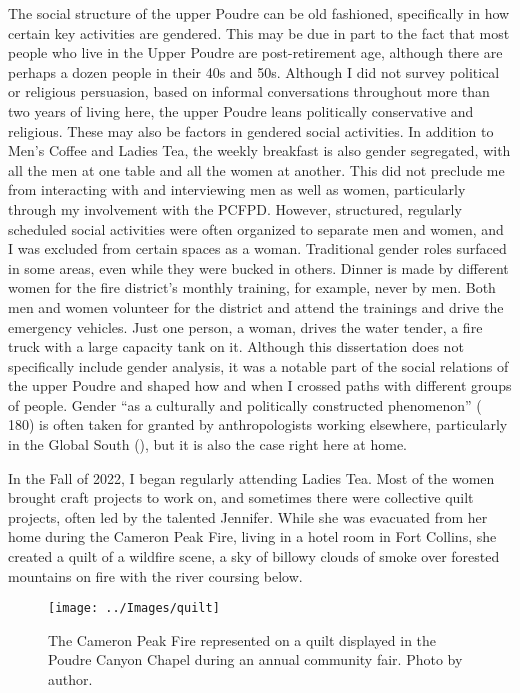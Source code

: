 \documentclass[
]{article}
\begin{document}
The social structure of the upper Poudre can be old fashioned, specifically in how certain key activities are gendered. This may be due in part to the fact that most people who live in the Upper Poudre are post-retirement age, although there are perhaps a dozen people in their 40s and 50s. Although I did not survey political or religious persuasion, based on informal conversations throughout more than two years of living here, the upper Poudre leans politically conservative and religious. These may also be factors in gendered social activities. In addition to Men's Coffee and Ladies Tea, the weekly breakfast is also gender segregated, with all the men at one table and all the women at another. This did not preclude me from interacting with and interviewing men as well as women, particularly through my involvement with the PCFPD. However, structured, regularly scheduled social activities were often organized to separate men and women, and I was excluded from certain spaces as a woman. Traditional gender roles surfaced in some areas, even while they were bucked in others. Dinner is made by different women for the fire district's monthly training, for example, never by men. Both men and women volunteer for the district and attend the trainings and drive the emergency vehicles. Just one person, a woman, drives the water tender, a fire truck with a large capacity tank on it. Although this dissertation does not specifically include gender analysis, it was a notable part of the social relations of the upper Poudre and shaped how and when I crossed paths with different groups of people. Gender ``as a culturally and politically constructed phenomenon'' ( 180) is often taken for granted by anthropologists working elsewhere, particularly in the Global South (), but it is also the case right here at home.

In the Fall of 2022, I began regularly attending Ladies Tea. Most of the women brought craft projects to work on, and sometimes there were collective quilt projects, often led by the talented Jennifer. While she was evacuated from her home during the Cameron Peak Fire, living in a hotel room in Fort Collins, she created a quilt of a wildfire scene, a sky of billowy clouds of smoke over forested mountains on fire with the river coursing below.

\begin{figure}
\texttt{[image: ../Images/quilt]} \caption[Cameron Peak Fire quilt]{The Cameron Peak Fire represented on a quilt displayed in the Poudre Canyon Chapel during an annual community fair. Photo by author.}\label{fig:figureTitle-26}
\end{figure}
\end{document}
